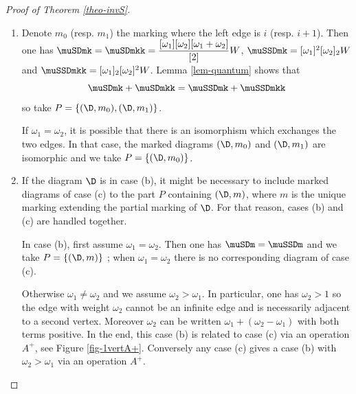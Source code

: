 \begin{proof}[Proof of Theorem \ref{theo-invS}]
\begin{enumerate}[label=(\alph*)]
\item Denote $m_0$ (resp. $m_1$) the marking where the left edge is $i$ (resp. $i+1$). Then one has $\muSDmk = \muSDmkk = \dfrac{[\omega_1][\omega_2][\omega_1+\omega_2]}{[2]} W$, $\muSSDmk = [\omega_1]^2 [\omega_2]_2 W$ and $\muSSDmkk = [\omega_1]_2 [\omega_2]^2 W$. Lemma \ref{lem-quantum} shows that 
\[ \muSDmk + \muSDmkk = \muSSDmk + \muSSDmkk  \]
so take $P = \{(\D,m_0), (\D,m_1)\}$.

If $\omega_1=\omega_2$, it is possible that there is an isomorphism which exchanges the two edges. In that case, the marked diagrams $(\D,m_0)$ and $(\D,m_1)$ are isomorphic and we take $P = \{(\D,m_0)\}$.


\item[(b,c)] If the diagram $\D$ is in case (b), it might be necessary to include marked diagrams of case (c) to the part $P$ containing $(\D,m)$, where $m$ is the unique marking extending the partial marking of $\D$. For that reason, cases (b) and (c) are handled together.

In case (b), first assume $\omega_1=\omega_2$. Then one has $\muSDm = \muSSDm$ and we take $P=\{(\D,m)\}$ ; when $\omega_1 = \omega_2$ there is no corresponding diagram of case (c).

Otherwise $\omega_1 \neq \omega_2$ and we assume $\omega_2 > \omega_1$. In particular, one has $\omega_2>1$ so the edge with weight $\omega_2$ cannot be an infinite edge and is necessarily adjacent to a second vertex. Moreover $\omega_2$ can be written $\omega_1 + (\omega_2-\omega_1)$ with both terms positive. In the end, this case (b) is related to case (c) via an operation $A^+$, see Figure \ref{fig-1vertA+}. 
Conversely any case (c) gives a case (b) with $\omega_2 > \omega_1$ via an operation $A^+$.

\begin{figure}[h]
	\centering
{}
\end{figure}
\end{enumerate}
\end{proof}
